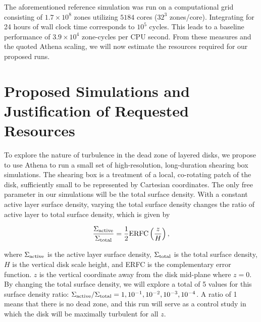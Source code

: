 \documentclass[preprint]{aastex}
\begin{document}
The aforementioned reference simulation was run on a computational grid consisting of $1.7 \times 10^8$ zones utilizing $5184$ cores ($32^3$ zones/core).
Integrating for 24 hours of wall clock time corresponds to $10^5$ cycles.  This leads to a baseline performance of $3.9 \times 10^4$ zone-cycles per CPU second.
From these measures and the quoted {\sc Athena} scaling, we will now estimate the resources required for our proposed runs.


\vspace{-8mm}
\section{Proposed Simulations and Justification of Requested Resources}
\vspace{-2mm}

To explore the nature of turbulence in the dead zone of layered disks, we propose to use {\sc Athena} to run a small set of high-resolution, long-duration shearing box simulations.  The shearing box is a treatment of a local, co-rotating patch of the disk, sufficiently small to be represented by Cartesian coordinates.  The only free parameter in our simulations will be the total surface density.  With a constant active layer surface density, varying the total surface density changes the ratio of active layer to total surface density, which is given by

\begin{equation}
\label{ratio}
\frac{\Sigma_{\rm active}}{\Sigma_{\rm total}} = \frac{1}{2}{\rm ERFC}\left(\frac{z}{H}\right),
\end{equation}

\noindent
where $\Sigma_{\rm active}$ is the active layer surface density, $\Sigma_{\rm total}$ is the total surface density, $H$ is the vertical disk scale height, and ERFC is the complementary error function.  $z$ is the vertical coordinate away from the disk mid-plane where $z = 0$.  By changing the total surface density, we will explore a total of 5 values for this surface density ratio: $\Sigma_{\rm active}/\Sigma_{\rm total} = 1, 10^{-1}, 10^{-2}, 10^{-3}, 10^{-4}$.  A ratio of 1 means that there is no dead zone, and this run will serve as a control study in which the disk will be maximally turbulent for all $z$.  
\end{document}
